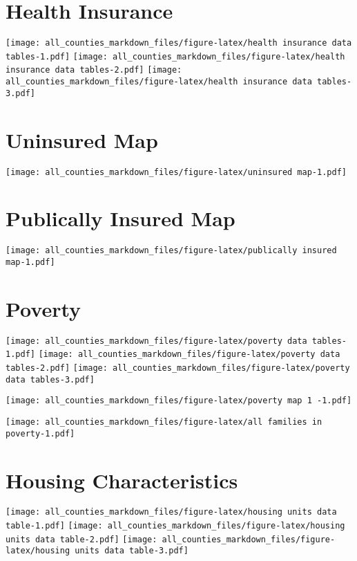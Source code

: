 \documentclass[
]{article}
\begin{document}
\hypertarget{health-insurance}{%
\section{Health Insurance}\label{health-insurance}}

\texttt{[image: all\_counties\_markdown\_files/figure-latex/health insurance data tables-1.pdf]}
\texttt{[image: all\_counties\_markdown\_files/figure-latex/health insurance data tables-2.pdf]}
\texttt{[image: all\_counties\_markdown\_files/figure-latex/health insurance data tables-3.pdf]}

\hypertarget{uninsured-map}{%
\section{Uninsured Map}\label{uninsured-map}}

\texttt{[image: all\_counties\_markdown\_files/figure-latex/uninsured map-1.pdf]}

\hypertarget{publically-insured-map}{%
\section{Publically Insured Map}\label{publically-insured-map}}

\texttt{[image: all\_counties\_markdown\_files/figure-latex/publically insured map-1.pdf]}

\hypertarget{poverty}{%
\section{Poverty}\label{poverty}}

\texttt{[image: all\_counties\_markdown\_files/figure-latex/poverty data tables-1.pdf]}
\texttt{[image: all\_counties\_markdown\_files/figure-latex/poverty data tables-2.pdf]}
\texttt{[image: all\_counties\_markdown\_files/figure-latex/poverty data tables-3.pdf]}

\texttt{[image: all\_counties\_markdown\_files/figure-latex/poverty map 1 -1.pdf]}

\texttt{[image: all\_counties\_markdown\_files/figure-latex/all families in poverty-1.pdf]}

\hypertarget{housing-characteristics}{%
\section{Housing Characteristics}\label{housing-characteristics}}

\texttt{[image: all\_counties\_markdown\_files/figure-latex/housing units data table-1.pdf]}
\texttt{[image: all\_counties\_markdown\_files/figure-latex/housing units data table-2.pdf]}
\texttt{[image: all\_counties\_markdown\_files/figure-latex/housing units data table-3.pdf]}
\end{document}
